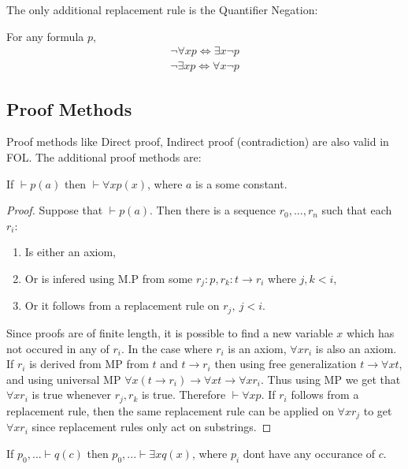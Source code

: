 The only additional replacement rule is the Quantifier Negation:
\begin{property}
  For any formula $p$,
  \begin{align*}
    \lnot \forall x p \iff \exists x \lnot p\\
    \lnot \exists x p \iff \forall x \lnot p
  \end{align*}
\end{property}
\subsection{Proof Methods}
Proof methods like Direct proof, Indirect proof (contradiction) are also valid in FOL. The additional proof methods are:
\begin{proposition}
  If $\vdash p(a)$ then $\vdash \forall xp(x)$, where $a$ is a some constant.
\end{proposition}
\begin{proof}
  Suppose that $\vdash p(a)$. Then there is a sequence $r_0,...,r_n$ such that each $r_i$:
  \begin{enumerate}
    \item Is either an axiom,
    \item Or is infered using M.P from some $r_j:p, r_k:t\to r_i$ where $j,k<i$,
    \item Or it follows from a replacement rule on $r_j,\ j<i$.
  \end{enumerate}
  Since proofs are of finite length, it is possible to find a new variable $x$ which has not occured in any of $r_i$. In the case where $r_i$ is an axiom, $\forall x r_i$ is also an axiom. If $r_i$ is derived from MP from $t$ and $t\to r_i$ then using free generalization $t\to \forall xt$, and using universal MP $\forall x (t\to r_i) \to \forall x t \to \forall x r_i$. Thus using MP we get that $\forall x r_i$ is true whenever $r_j, r_k$ is true. Therefore $\vdash \forall x p$. If $r_i$ follows from a replacement rule, then the same replacement rule can be applied on $\forall x r_j$ to get $\forall x r_i$ since replacement rules only act on substrings.
\end{proof}
\begin{proposition}
  If $p_0,... \vdash q(c)$ then $p_0,... \vdash \exists x q(x)$, where $p_i$ dont have any occurance of $c$. 
\end{proposition}

